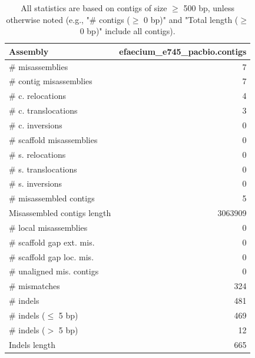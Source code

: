 \documentclass[12pt,a4paper]{article}
\begin{document}
\begin{table}[ht]
\begin{center}
\caption{All statistics are based on contigs of size $\geq$ 500 bp, unless otherwise noted (e.g., "\# contigs ($\geq$ 0 bp)" and "Total length ($\geq$ 0 bp)" include all contigs).}
\begin{tabular}{|l*{1}{|r}|}
\hline
Assembly & efaecium\_e745\_pacbio.contigs \\ \hline
\# misassemblies & 7 \\ \hline
\hspace{2mm}\# contig misassemblies & 7 \\ \hline
\hspace{5mm}\# c. relocations & 4 \\ \hline
\hspace{5mm}\# c. translocations & 3 \\ \hline
\hspace{5mm}\# c. inversions & 0 \\ \hline
\hspace{2mm}\# scaffold misassemblies & 0 \\ \hline
\hspace{5mm}\# s. relocations & 0 \\ \hline
\hspace{5mm}\# s. translocations & 0 \\ \hline
\hspace{5mm}\# s. inversions & 0 \\ \hline
\# misassembled contigs & 5 \\ \hline
Misassembled contigs length & 3063909 \\ \hline
\# local misassemblies & 0 \\ \hline
\# scaffold gap ext. mis. & 0 \\ \hline
\# scaffold gap loc. mis. & 0 \\ \hline
\# unaligned mis. contigs & 0 \\ \hline
\# mismatches & 324 \\ \hline
\# indels & 481 \\ \hline
\hspace{5mm}\# indels ($\leq$ 5 bp) & 469 \\ \hline
\hspace{5mm}\# indels ($>$ 5 bp) & 12 \\ \hline
Indels length & 665 \\ \hline
\end{tabular}
\end{center}
\end{table}
\end{document}
